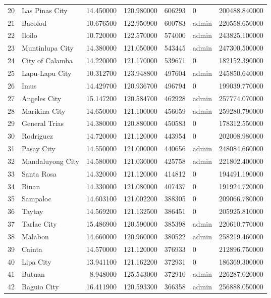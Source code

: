 \begin{longtable}{rlrrrlr}
20 & Las Pinas City & 14.450000 & 120.980000 & 606293 & 0 & 200488.840000 \\
21 & Bacolod & 10.676500 & 122.950900 & 600783 & admin & 220558.650000 \\
22 & Iloilo & 10.720000 & 122.570000 & 574000 & admin & 243825.100000 \\
23 & Muntinlupa City & 14.380000 & 121.050000 & 543445 & admin & 247300.500000 \\
24 & City of Calamba & 14.220000 & 121.170000 & 539671 & 0 & 182152.390000 \\
25 & Lapu-Lapu City & 10.312700 & 123.948800 & 497604 & admin & 245850.640000 \\
26 & Imus & 14.429700 & 120.936700 & 496794 & 0 & 199039.770000 \\
27 & Angeles City & 15.147200 & 120.584700 & 462928 & admin & 257774.070000 \\
28 & Marikina City & 14.650000 & 121.100000 & 456059 & admin & 259280.790000 \\
29 & General Trias & 14.380000 & 120.880000 & 450583 & 0 & 178312.550000 \\
30 & Rodriguez & 14.720000 & 121.120000 & 443954 & 0 & 202008.980000 \\
31 & Pasay City & 14.550000 & 121.000000 & 440656 & admin & 248084.660000 \\
32 & Mandaluyong City & 14.580000 & 121.030000 & 425758 & admin & 221802.400000 \\
33 & Santa Rosa & 14.320000 & 121.120000 & 414812 & 0 & 194491.190000 \\
34 & Binan & 14.330000 & 121.080000 & 407437 & 0 & 191924.720000 \\
35 & Sampaloc & 14.603100 & 121.002200 & 388305 & 0 & 209066.780000 \\
36 & Taytay & 14.569200 & 121.132500 & 386451 & 0 & 205925.810000 \\
37 & Tarlac City & 15.486900 & 120.590000 & 385398 & admin & 220610.770000 \\
38 & Malabon & 14.660000 & 120.960000 & 380522 & admin & 258219.460000 \\
39 & Cainta & 14.570000 & 121.120000 & 376933 & 0 & 212896.750000 \\
40 & Lipa City & 13.941100 & 121.162200 & 372931 & 0 & 186369.300000 \\
41 & Butuan & 8.948000 & 125.543000 & 372910 & admin & 226287.020000 \\
42 & Baguio City & 16.411900 & 120.593300 & 366358 & admin & 256888.050000 \\

\end{longtable}

